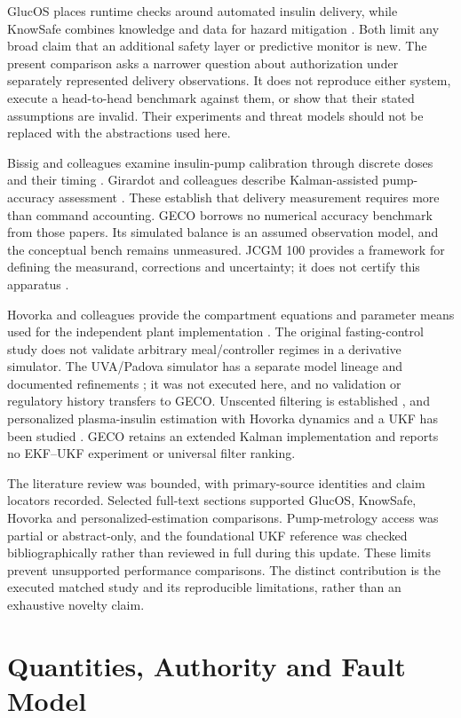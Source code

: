 \documentclass[journal,10pt,letterpaper]{IEEEtran}
\begin{document}
GlucOS places runtime checks around automated insulin delivery, while
KnowSafe combines knowledge and data for hazard mitigation
\cite{R01,R02}. Both limit any broad claim that an additional safety
layer or predictive monitor is new. The present comparison asks a
narrower question about authorization under separately represented
delivery observations. It does not reproduce either system, execute a
head-to-head benchmark against them, or show that their stated
assumptions are invalid. Their experiments and threat models should not
be replaced with the abstractions used here.

Bissig and colleagues examine insulin-pump calibration through discrete
doses and their timing \cite{R03}. Girardot and colleagues describe
Kalman-assisted pump-accuracy assessment \cite{R04}. These establish
that delivery measurement requires more than command accounting. GECO
borrows no numerical accuracy benchmark from those papers. Its simulated
balance is an assumed observation model, and the conceptual bench
remains unmeasured. JCGM 100 provides a framework for defining the
measurand, corrections and uncertainty; it does not certify this
apparatus \cite{R09}.

Hovorka and colleagues provide the compartment equations and parameter
means used for the independent plant implementation \cite{R05}. The
original fasting-control study does not validate arbitrary
meal/controller regimes in a derivative simulator. The UVA/Padova
simulator has a separate model lineage and documented refinements
\cite{R08}; it was not executed here, and no validation or regulatory
history transfers to GECO. Unscented filtering is established
\cite{R06}, and personalized plasma-insulin estimation with Hovorka
dynamics and a UKF has been studied \cite{R07}. GECO retains an extended
Kalman implementation and reports no EKF--UKF experiment or universal
filter ranking.

The literature review was bounded, with primary-source identities and
claim locators recorded. Selected full-text sections supported GlucOS,
KnowSafe, Hovorka and personalized-estimation comparisons.
Pump-metrology access was partial or abstract-only, and the foundational
UKF reference was checked bibliographically rather than reviewed in full
during this update. These limits prevent unsupported performance
comparisons. The distinct contribution is the executed matched study and
its reproducible limitations, rather than an exhaustive novelty claim.

\section{Quantities, Authority and Fault Model}
\end{document}
